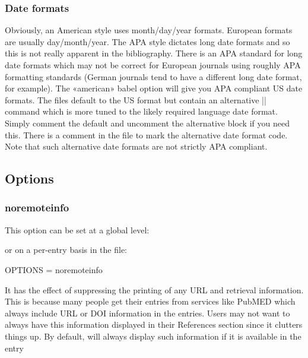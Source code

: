 \documentclass{ltxdockit}
\begin{document}
\subsubsection{Date formats}

Obviously, an American style uses month/day/year formats. European formats
are usually day/month/year. The APA style dictates long date formats and so
this is not really apparent in the bibliography. There is an APA standard
for long date formats which may not be correct for European journals using
roughly APA formatting standards (German journals tend to have a different
long date format, for example). The «american» babel option will give you
APA compliant US date formats. The  files default to the US
format but contain an alternative |\DefineBibliographyExtras| command which
is more tuned to the likely required language date format. Simply comment the
default and uncomment the alternative block if you need this. There is a
comment in the file to mark the alternative date format code. Note that
such alternative date formats are not strictly APA compliant.

\subsection{Options}
\label{use:options}

\subsubsection{noremoteinfo}

This option can be set at a global level:

\begin{ltxcode}
\usepackage[noremoteinfo,style=apa]{biblatex}
\end{ltxcode}

or on a per-entry basis in the  file:

\begin{ltxcode}
OPTIONS = {noremoteinfo}
\end{ltxcode}

It has the effect of suppressing the printing of any URL and retrieval
information. This is because many people get their  entries from
services like PubMED which always include URL or DOI information in the
entries. Users may not want to always have this information displayed in
their References section since it clutters things up. By default,
 will always display such information if it is available
in the  entry
\end{document}
